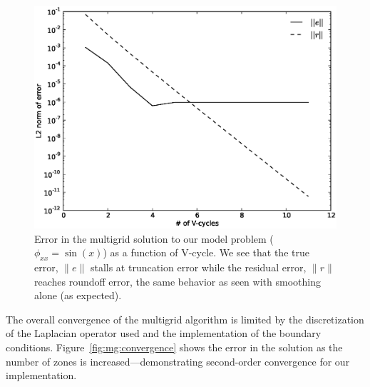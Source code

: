 \begin{figure}
\centering
\includegraphics[width=5.5in]{mg_error_vs_cycle}
\caption[Error in solution as a function of multigrid V-cycle
  number.]{\label{fig:mgerror} Error in the multigrid solution to our
  model problem ($\phi_{xx} = \sin(x)$) as a function of V-cycle.  We
  see that the true error, $\|e\|$ stalls at truncation error while
  the residual error, $\|r\|$ reaches roundoff error, the same
  behavior as seen with smoothing alone (as expected). \\
  }
\end{figure}

The overall convergence of the multigrid algorithm is limited by the
discretization of the Laplacian operator used and the implementation
of the boundary conditions.  Figure~\ref{fig:mg:convergence} shows
the error in the solution as the number of zones is increased---demonstrating
second-order convergence for our implementation.

